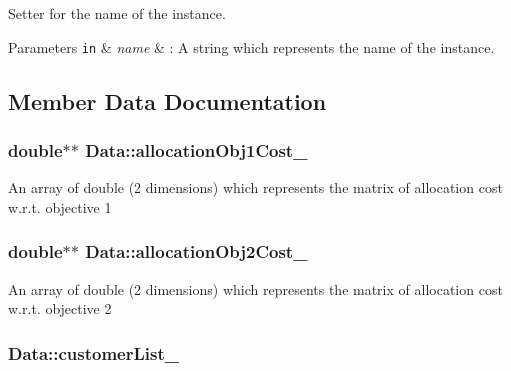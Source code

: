 \-Setter for the name of the instance. 


\begin{DoxyParams}[1]{\-Parameters}
\mbox{\tt in}  & {\em name} & \-: \-A string which represents the name of the instance. \\
\hline
\end{DoxyParams}


\subsection{\-Member \-Data \-Documentation}
\hypertarget{classData_a28bb6f7481882d1b3547b1c040ee6707}{
\subsubsection[{allocation\-Obj1\-Cost\-\_\-}]{\setlength{\rightskip}{0pt plus 5cm}double$\ast$$\ast$ {\bf \-Data\-::allocation\-Obj1\-Cost\-\_\-}}}\label{classData_a28bb6f7481882d1b3547b1c040ee6707}
\-An array of double (2 dimensions) which represents the matrix of allocation cost w.\-r.\-t. objective 1 \hypertarget{classData_a3606ed9ae6bfba092ceab4ea0af9bfd1}{
\subsubsection[{allocation\-Obj2\-Cost\-\_\-}]{\setlength{\rightskip}{0pt plus 5cm}double$\ast$$\ast$ {\bf \-Data\-::allocation\-Obj2\-Cost\-\_\-}}}\label{classData_a3606ed9ae6bfba092ceab4ea0af9bfd1}
\-An array of double (2 dimensions) which represents the matrix of allocation cost w.\-r.\-t. objective 2 \hypertarget{classData_a2c241adf75d61538b75a383b5432b5f4}{
\subsubsection[{customer\-List\-\_\-}]{ {\bf \-Data\-::customer\-List\-\_\-}}}\label{classData_a2c241adf75d61538b75a383b5432b5f4}
